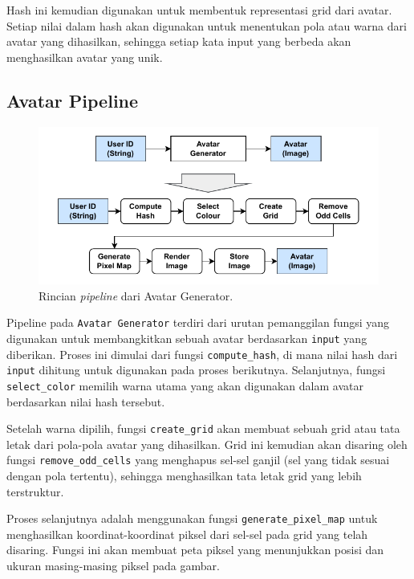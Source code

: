 Hash ini kemudian digunakan untuk membentuk representasi grid dari avatar. Setiap nilai dalam hash akan digunakan untuk menentukan pola atau warna dari avatar yang dihasilkan, sehingga setiap kata input yang berbeda akan menghasilkan avatar yang unik.


\subsection{Avatar Pipeline}
\begin{figure}[h]
	\begin{center}
		\includegraphics[width=1\textwidth]{../assets/avatar-pipeline.pdf}
	\end{center}
\caption{Rincian \textit{pipeline} dari Avatar Generator.}
\end{figure}

Pipeline pada \texttt{Avatar Generator} terdiri dari urutan pemanggilan fungsi yang digunakan untuk membangkitkan sebuah avatar berdasarkan \texttt{input} yang diberikan. Proses ini dimulai dari fungsi \texttt{compute\_hash}, di mana nilai hash dari \texttt{input} dihitung untuk digunakan pada proses berikutnya. Selanjutnya, fungsi \texttt{select\_color} memilih warna utama yang akan digunakan dalam avatar berdasarkan nilai hash tersebut.

Setelah warna dipilih, fungsi \texttt{create\_grid} akan membuat sebuah grid atau tata letak dari pola-pola avatar yang dihasilkan. Grid ini kemudian akan disaring oleh fungsi \texttt{remove\_odd\_cells} yang menghapus sel-sel ganjil (sel yang tidak sesuai dengan pola tertentu), sehingga menghasilkan tata letak grid yang lebih terstruktur.

Proses selanjutnya adalah menggunakan fungsi \texttt{generate\_pixel\_map} untuk menghasilkan koordinat-koordinat piksel dari sel-sel pada grid yang telah disaring. Fungsi ini akan membuat peta piksel yang menunjukkan posisi dan ukuran masing-masing piksel pada gambar.

